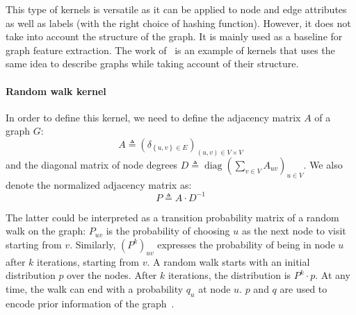                This type of kernels is versatile as it can be applied to node and edge attributes as well as labels (with the right choice of hashing function).
                However, it does not take into account the structure of the graph.
                It is mainly used as a baseline for graph feature extraction.
                The work of~\textcite{shervashidze2011weisfeiler} is an example of kernels that uses the same idea to describe graphs while taking account of their structure.
            
            \paragraph{Random walk kernel}
                In order to define this kernel, we need to define the adjacency matrix $A$ of a graph $G$:
                \begin{equation}
                    \label{eq::adjacency_matrix}
                    A \triangleq \left(\delta_{\left\{u,v\right\}\in E}\right)_{(u, v) \in V\times V}
                \end{equation}
                and the diagonal matrix of node degrees $D\triangleq \operatorname{diag}\left(\sum_{v \in V}A_{uv}\right)_{u \in V}$.
                We also denote the normalized adjacency matrix as:
                \begin{equation}
                    \label{eq::normalized_adjacency_matrix}
                    P \triangleq A\cdot D^{-1}
                \end{equation}

                The latter could be interpreted as a transition probability matrix of a random walk on the graph:
                $P_{uv}$ is the probability of choosing $u$ as the next node to visit starting from $v$.
                Similarly, $\left(P^k\right)_{uv}$ expresses the probability of being in node $u$ after $k$ iterations, starting from $v$.
                A random walk starts with an initial distribution $p$ over the nodes.
                After $k$ iterations, the distribution is $P^k\cdot p$.
                At any time, the walk can end with a probability $q_u$ at node $u$.
                $p$ and $q$ are used to encode prior information of the graph~\parencite{vishwanathan2010graph}.\\
                
